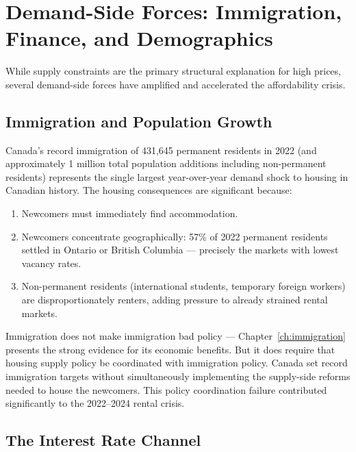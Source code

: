 \section{Demand-Side Forces: Immigration, Finance, and Demographics}
\label{sec:demand_side}

While supply constraints are the primary structural explanation for high
prices, several demand-side forces have amplified and accelerated the
affordability crisis.

\subsection{Immigration and Population Growth}

Canada's record immigration of 431{,}645 permanent residents in 2022 (and
approximately 1 million total population additions including non-permanent
residents) represents the single largest year-over-year demand shock to
housing in Canadian history. The housing consequences are significant because:

\begin{enumerate}
  \item Newcomers must immediately find accommodation.
  \item Newcomers concentrate geographically: 57\% of 2022 permanent
        residents settled in Ontario or British Columbia --- precisely the
        markets with lowest vacancy rates.
  \item Non-permanent residents (international students, temporary foreign
        workers) are disproportionately renters, adding pressure to already
        strained rental markets.
\end{enumerate}

Immigration does not make immigration bad policy --- Chapter~\ref{ch:immigration}
presents the strong evidence for its economic benefits. But it does require
that housing supply policy be coordinated with immigration policy. Canada
set record immigration targets without simultaneously implementing the
supply-side reforms needed to house the newcomers. This policy coordination
failure contributed significantly to the 2022--2024 rental crisis.

\subsection{The Interest Rate Channel}

